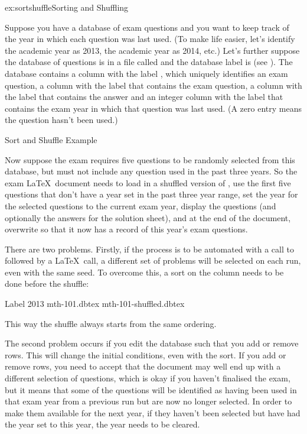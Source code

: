 \begin{example}{ex:sortshuffle}{Sorting and Shuffling}

Suppose you have a database of exam questions and you want to keep
track of the year in which each question was last used. (To make life
easier, let's identify the academic year  as 2013, the
academic year  as 2014, etc.) Let's further suppose the
database of questions is in a file called 
and the database label is  (see 
). The database 
contains a column with the label , which
uniquely identifies an exam question, a column with the label
 that contains the exam question, a column
with the label  that contains the answer and
an integer column with the label  that contains the
exam year in which that question was last used. (A zero entry means the
question hasn't been used.)

 {%
 }
 {Sort and Shuffle Example}

Now suppose the exam requires five questions to be randomly selected from 
this database, but must not include any question used in the past three 
years. So the exam \LaTeX\ document needs to load in a shuffled
version of , use the first five questions that don't
have a year set in the past three year range, set the year for the
selected questions to the current exam year, display the questions (and
optionally the answers for the solution sheet), and at the end of the
document, overwrite  so that it now has 
a record of this year's exam questions.

There are two problems. Firstly, if the process is to be automated
with a call to   followed by 
a \LaTeX\ call, a different set of problems will be selected
on each run, even with the same seed. To overcome this, a sort on 
the  column needs to be done before the shuffle:
\begin{terminal}
  Label  2013   mth-101.dbtex \continueline {} mth-101-shuffled.dbtex
\end{terminal}
\ContExplan
This way the shuffle always starts from the same ordering.

The second problem occurs if you edit the database such that you add or
remove rows. This will change the initial conditions, even with the sort.
If you add or remove rows, you need to accept that the document may well
end up with a different selection of questions, which is okay if
you haven't finalised the exam, but it means that some of the questions
will be identified as having been used in that exam year from 
a previous run but are now no longer selected. In order to make them
available for the next year, if they haven't been selected but have had the
year set to this year, the year needs to be cleared.


\end{example}
